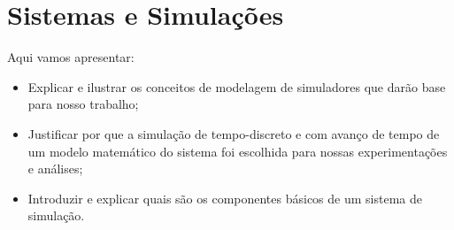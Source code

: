 \chapter{\label{chap:simulation}Sistemas e Simulações}

Aqui vamos apresentar:

\begin{itemize}
  \item Explicar e ilustrar os conceitos de modelagem de simuladores que darão base para nosso trabalho;
  \item Justificar por que a simulação de tempo-discreto e com avanço de tempo de um modelo matemático do sistema foi escolhida para nossas experimentações e análises;
  \item Introduzir e explicar quais são os componentes básicos de um sistema de simulação.
\end{itemize}

\cite{Banks} \cite{Law} \cite{Ross}